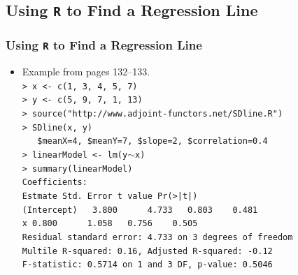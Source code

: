 \documentclass[t]{beamer}
\begin{document}
\subsection{Using \texttt{R} to Find a Regression Line}
\begin{frame}\frametitle{Using \texttt{R} to Find a Regression Line}
{\small
\begin{itemize}
\item Example from pages 132--133.\\
   \texttt{> x <- c(1, 3, 4, 5, 7)}\\
   \texttt{> y <- c(5, 9, 7, 1, 13)}\\
   \texttt{> source("http://www.adjoint-functors.net/SDline.R")}\\
   \texttt{> SDline(x, y)}\\
   \texttt{\ \ \ \$meanX=4, \$meanY=7, \$slope=2, \$correlation=0.4}\\[3pt]
   \texttt{> linearModel <- lm(y$\sim$x)}\\
   \texttt{> summary(linearModel)}\\
   \texttt{Coefficients:}\\
   \texttt{\hphantom{Coefficients}Estmate Std.~Error t value Pr(>|t|)}\\
   \texttt{(Intercept)            \ \  3.800\ \ \ \ \ \ 4.733 
             \ \ 0.803 \ \ \   0.481}\\
   \texttt{x\hphantom{(coefficient}    0.800\ \ \ \ \ \ 1.058  
             \ \ 0.756 \ \ \   0.505}\\
   \texttt{Residual standard error:  4.733 on 3 degrees of freedom}\\
   \texttt{Multile R-squared:~0.16, Adjusted R-squared:~-0.12}\\
   \texttt{F-statistic:~0.5714 on 1 and 3 DF, p-value:~0.5046}
\end{itemize}
}
\end{frame}
\end{document}

